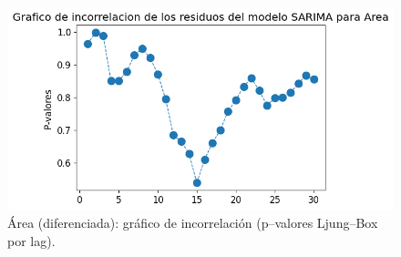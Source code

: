 \begin{figure}[H]\centering
\includegraphics[scale=.52]{Figures/inco_area_d.png}
\caption{Área (diferenciada): gráfico de incorrelación (p--valores Ljung--Box por lag).}
\label{fig:inco_area_d}
\end{figure}